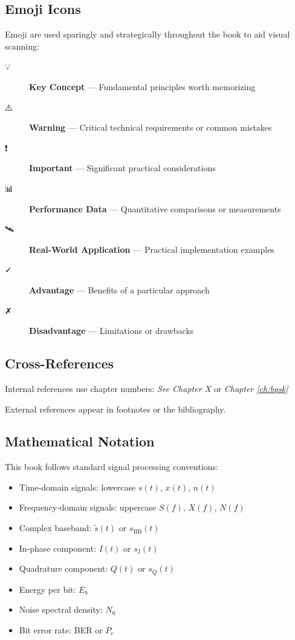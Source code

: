 \subsection*{Emoji Icons}

Emoji are used sparingly and strategically throughout the book to aid visual scanning:

\begin{description}
\item[💡] \textbf{Key Concept} --- Fundamental principles worth memorizing
\item[⚠️] \textbf{Warning} --- Critical technical requirements or common mistakes
\item[❗] \textbf{Important} --- Significant practical considerations
\item[📊] \textbf{Performance Data} --- Quantitative comparisons or measurements
\item[🛰️] \textbf{Real-World Application} --- Practical implementation examples
\item[✓] \textbf{Advantage} --- Benefits of a particular approach
\item[✗] \textbf{Disadvantage} --- Limitations or drawbacks
\end{description}

\subsection*{Cross-References}

Internal references use chapter numbers: \textit{See Chapter X} or \textit{Chapter \ref{ch:bpsk}}

External references appear in footnotes or the bibliography.

\subsection*{Mathematical Notation}

This book follows standard signal processing conventions:

\begin{itemize}
\item Time-domain signals: lowercase $s(t)$, $x(t)$, $n(t)$
\item Frequency-domain signals: uppercase $S(f)$, $X(f)$, $N(f)$
\item Complex baseband: $\tilde{s}(t)$ or $s_{\mathrm{BB}}(t)$
\item In-phase component: $I(t)$ or $s_I(t)$
\item Quadrature component: $Q(t)$ or $s_Q(t)$
\item Energy per bit: $E_b$
\item Noise spectral density: $N_0$
\item Bit error rate: BER or $P_e$
\end{itemize}

